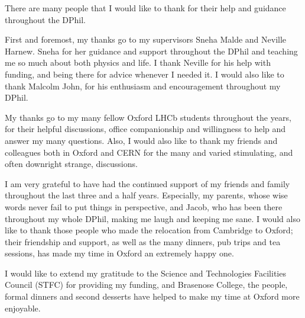 
There are many people that I would like to thank for their help and guidance throughout the DPhil. 

First and foremost, my thanks go to my supervisors Sneha Malde and Neville Harnew. Sneha for her guidance and support throughout the DPhil and teaching me so much about both physics and life. I thank Neville for his help with funding, and being there for advice whenever I needed it. I would also like to thank Malcolm John, for his enthusiasm and encouragement throughout my DPhil.

My thanks go to my many fellow Oxford LHCb students throughout the years, for their helpful discussions, office companionship and willingness to help and answer my many questions. Also, I would also like to thank my friends and colleagues both in Oxford and CERN for the many and varied stimulating, and often downright strange, discussions.

I am very grateful to have had the continued support of my friends and family throughout the last three and a half years. Especially, my parents, whose wise words never fail to put things in perspective, and Jacob, who has been there throughout my whole DPhil, making me laugh and keeping me sane. I would also like to thank those people who made the relocation from Cambridge to Oxford; their friendship and support, as well as the many dinners, pub trips and tea sessions, has made my time in Oxford an extremely happy one.

I would like to extend my gratitude to the Science and Technologies Facilities Council (STFC) for providing my funding, and Brasenose College, the people, formal dinners and second desserts have helped to make my time at Oxford more enjoyable.